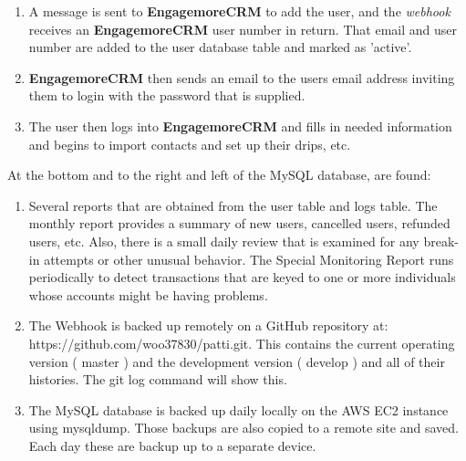 \documentclass[final,letterpaper,12pt]{article}
\begin{document}
\begin{enumerate}
\begin{enumerate}
\end{enumerate}
\item A message is sent to {\bf EngagemoreCRM} to add the user, and the {\it webhook} receives an {\bf EngagemoreCRM} user number in return.  That email and user number are added to the user database table and marked as 'active'.
\item {\bf EngagemoreCRM} then sends an email to the users email address inviting them to login with the password that is supplied.
\item The user then logs into {\bf EngagemoreCRM} and fills in needed information and begins to import contacts and set up their drips, etc.
\end{enumerate}

\noindent At the bottom and to the right and left of the MySQL database, are found:
\begin{enumerate}
\item Several reports that are obtained from the user table and logs table.  The monthly report provides a summary of new users, cancelled users, refunded users, etc.  Also, there is a small daily review that is examined for any break-in attempts or other unusual behavior.  The Special Monitoring Report runs periodically to detect transactions that are keyed to one or more individuals whose accounts might be having problems.
\item The Webhook is backed up remotely on a GitHub repository at: \\
https://github.com/woo37830/patti.git.  This contains the current operating version ( master ) and the development version ( develop ) and all of their histories.  The git log command will show this.
\item The MySQL database is backed up daily locally on the AWS EC2 instance using mysqldump.  Those backups are also copied to a remote site and saved.  Each day these are backup up to a separate device.
\end{enumerate}
\newpage
\end{document}
